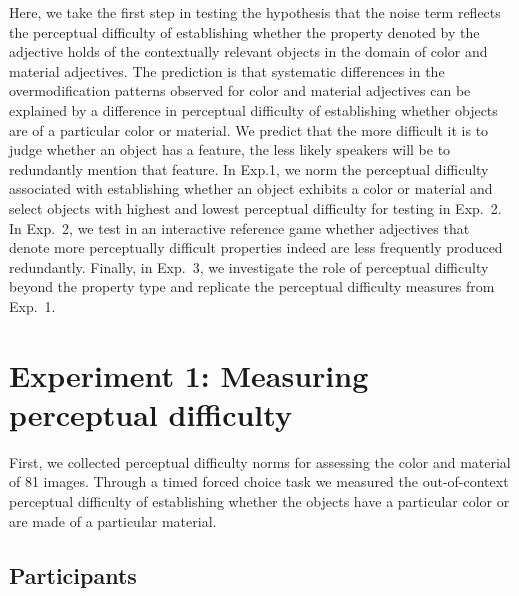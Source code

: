 \documentclass[12pt,letterpaper]{article}
\begin{document}
Here, we take the first step in testing the hypothesis that the noise term reflects the perceptual difficulty of establishing whether the property denoted by the adjective holds of the contextually relevant objects in the domain of color and material adjectives. The prediction is that systematic differences in the overmodification patterns observed for color and material adjectives can be explained by a difference in perceptual difficulty of establishing whether objects are of a particular color or material. We predict that the more difficult it is to judge whether an object has a feature, the less likely speakers will be to redundantly mention that feature. In Exp.1, we norm the perceptual difficulty associated with establishing whether an object exhibits a color or material and select objects with highest and lowest perceptual difficulty for testing in Exp.~2. In Exp.~2, we test in an interactive reference game whether adjectives that denote more perceptually difficult properties indeed are less frequently produced redundantly. Finally, in Exp.~3, we investigate the role of perceptual difficulty beyond the property type and replicate the perceptual difficulty measures from Exp.~1.




\section{Experiment 1: Measuring perceptual difficulty} 

First, we collected perceptual difficulty norms for assessing the color and material  of 81 images. Through a timed forced choice task we measured the out-of-context perceptual difficulty of establishing whether the objects have a particular color or are made of a particular material.

\subsection{Participants} 
\end{document}
